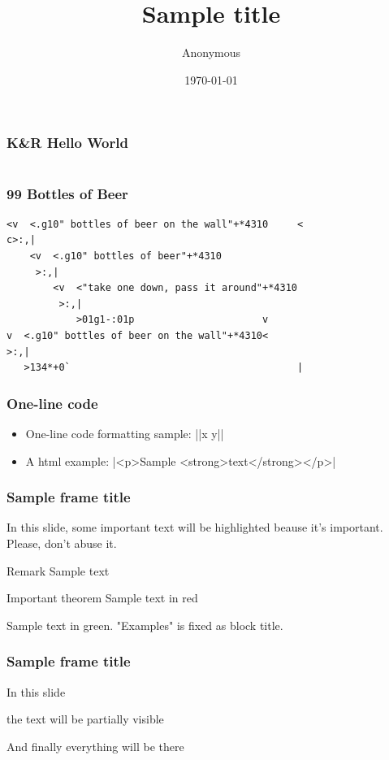 \documentclass[10pt]{beamer}
\title{Sample title}
\author{Anonymous}
\institute{Faculty of Physics\\
  Very Famous University}
\date{\today}
\newlength{\wideitemsep}
\let\olditem\item
\renewcommand{\item}{\setlength{\itemsep}{\wideitemsep}\olditem}
\begin{document}
\frame{\titlepage}

\begin{frame}[fragile]
\frametitle{K\&R Hello World}
\inputminted{c}{hello.c}
\end{frame}

\begin{frame}[fragile]
    \frametitle{99 Bottles of Beer}
\begin{verbatim}
<v  <.g10" bottles of beer on the wall"+*4310     <
c>:,|
    <v  <.g10" bottles of beer"+*4310
     >:,|
        <v  <"take one down, pass it around"+*4310
         >:,|
            >01g1-:01p                      v
v  <.g10" bottles of beer on the wall"+*4310<
>:,|
   >134*+0`                                       |
\end{verbatim}
\end{frame}

\begin{frame}
\frametitle{One-line code}
\begin{itemize}
\item One-line code formatting sample: 
|{|x \Rightarrow y|}|
\item A html example:
|<p>Sample <strong>text</strong></p>|
\end{itemize}
\end{frame}

\begin{frame}
\frametitle{Sample frame title}
 
In this slide, some important text will be
\alert{highlighted} beause it's important.
Please, don't abuse it.
 
\begin{block}{Remark}
Sample text
\end{block}
 
\begin{alertblock}{Important theorem}
Sample text in red 
\end{alertblock}
 
\begin{examples}
Sample text in green. "Examples" is fixed as block title.
\end{examples}
\end{frame}

{
\begin{frame}
\frametitle{Sample frame title}
 In this slide \pause
 
 the text will be partially visible \pause
 
 And finally everything will be there
\end{frame}
}
\end{document}
